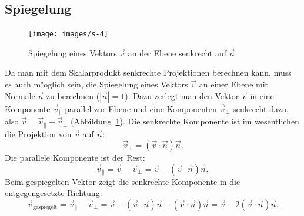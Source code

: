 \subsection{Spiegelung\label{spiegelung}}
\begin{figure}
\begin{center}
\texttt{[image: images/s-4]}
\end{center}
\caption{Spiegelung eines Vektors $\vec v$ an der Ebene senkrecht auf $\vec n$.
\label{image-spiegelung}}
\end{figure}
Da man mit dem Skalarprodukt senkrechte Projektionen berechnen kann,
muss es auch m"oglich sein, die Spiegelung eines Vektors $\vec v$
an einer Ebene mit Normale $\vec n$ zu berechnen ($|\vec n|=1$).
Dazu zerlegt man den Vektor $\vec v$ in eine Komponente $\vec v_{\|}$
parallel zur Ebene und eine Komponenten $\vec v_{\perp}$ senkrecht dazu,
also $\vec v=\vec v_{\|}+\vec v_{\perp}$ (Abbildung~\ref{image-spiegelung}).
Die senkrechte Komponente
ist im wesentlichen die Projektion von $\vec v$ auf $\vec n$:
\[
\vec v_{\perp}=
(\vec v\cdot\vec n)\vec n
.
\]
Die parallele Komponente ist der Rest:
\[
\vec v_{\|}=\vec v -\vec v_{\perp}=
\vec v-(\vec v\cdot\vec n)\vec n
,
\]
Beim gespiegelten Vektor zeigt die senkrechte Komponente in die
entgegengesetzte Richtung:
\begin{equation}
\vec v_{\text{gespiegelt}}=
\vec v_{\|}-\vec v_{\perp}
=
\vec v-(\vec v\cdot\vec n)\vec n
-
(\vec v\cdot\vec n)\vec n
=\vec v-2(\vec v\cdot\vec n)\vec n.
\label{equation:spiegelung}
\end{equation}

